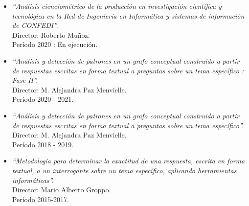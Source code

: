 \documentclass[
	11pt,oneside,a4paper,
	headsepline,footsepline,
	fleqn,
]{memoir}
\begin{document}
\begin{itemize}
	\item \emph{“Análisis cienciométrico de la producción en investigación científica y tecnológica en la Red de Ingeniería en Informática y sistemas de información de CONFEDI”.} \\
	      Director: Roberto Muñoz. \\
	      Período 2020 : En ejecución.
	\item \emph{“Análisis y detección de patrones en un grafo conceptual construido a partir de respuestas escritas en forma textual a preguntas sobre un tema específico : Fase II”.} \\
	      Director: M. Alejandra Paz Menvielle. \\
	      Período 2020 - 2021.
	\item \emph{“Análisis y detección de patrones en un grafo conceptual construido a partir de respuestas escritas en forma textual a preguntas sobre un tema específico”.} \\
	      Director: M. Alejandra Paz Menvielle. \\
	      Período 2018 - 2019.
	\item \emph{“Metodología para determinar la exactitud de una respuesta, escrita en forma textual, a un interrogante sobre un tema específico, aplicando herramientas informáticas”.} \\
	      Director: Mario Alberto Groppo. \\
	      Período 2015-2017.
\end{itemize}
\end{document}
